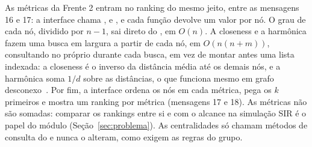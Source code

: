 As métricas da Frente 2 entram no ranking do mesmo jeito, entre as mensagens 16 e 17: a
interface chama ,  e
, e cada função devolve um valor por nó. O grau de cada nó, dividido por
$n - 1$, sai direto do , em $O(n)$. A closeness e a harmônica fazem uma busca em
largura a partir de cada nó, em $O(n(n + m))$, consultando  no próprio
 durante cada busca, em vez de montar antes uma lista indexada: a closeness é o
inverso da distância média até os demais nós, e a harmônica soma $1/d$ sobre as distâncias, o
que funciona mesmo em grafo desconexo~\cite{boldi2014}.
Por fim, a interface ordena os nós em cada métrica, pega os $k$ primeiros e mostra um ranking por métrica
(mensagens 17 e 18). As métricas não são somadas: comparar os rankings entre si e com o alcance
na simulação SIR é o papel do módulo  (Seção~\ref{sec:problema}). As
centralidades só chamam métodos de consulta do  e nunca o alteram, como exigem as
regras do grupo.
